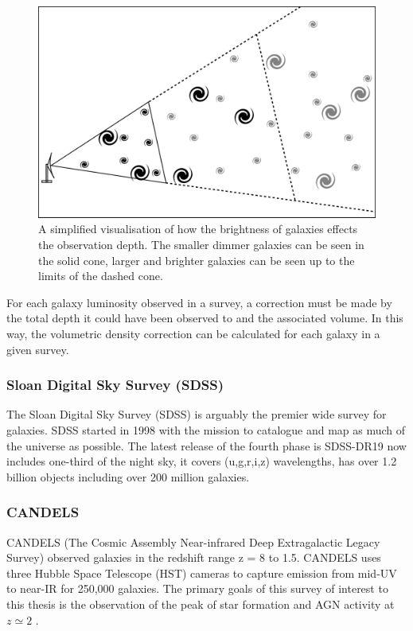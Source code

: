 \begin{figure}[h]
    \centering
    \includegraphics[width = \linewidth]{Figures/Chapter1/Vmax_Toon.png}
    \caption{A simplified visualisation of how the brightness of galaxies effects the observation depth. The smaller dimmer galaxies can be seen in the solid cone, larger and brighter galaxies can be seen up to the limits of the dashed cone.}
    \label{fig:Vmax}
\end{figure}

For each galaxy luminosity observed in a survey, a correction must be made by the total depth it could have been observed to and the associated volume. In this way, the volumetric density correction can be calculated for each galaxy in a given survey.

\subsubsection{Sloan Digital Sky Survey (SDSS)}

The Sloan Digital Sky Survey (SDSS) is arguably the premier wide survey for galaxies. SDSS started in 1998 with the mission to catalogue and map as much of the universe as possible. The latest release of the fourth phase is SDSS-DR19 \citep{Ahumada2019TheSpectra} now includes one-third of the night sky, it covers (u,g,r,i,z) wavelengths, has over 1.2 billion objects including over 200 million galaxies.

\subsubsection{CANDELS}
CANDELS (The Cosmic Assembly Near-infrared Deep Extragalactic Legacy Survey) observed galaxies in the redshift range z = 8 to 1.5. CANDELS uses three Hubble Space Telescope (HST) cameras to capture emission from mid-UV to near-IR for 250,000 galaxies. The primary goals of this survey of interest to this thesis is the observation of the peak of star formation and AGN activity at $z \simeq 2$ \cite{Grogin2011Candels:Survey}.

